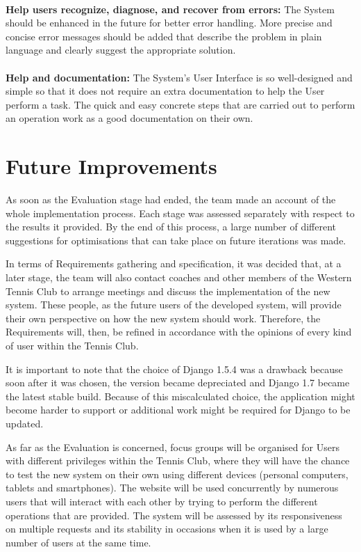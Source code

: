 \documentclass{l3proj}
\begin{document}
 \\
\textbf{Help users recognize, diagnose, and recover from errors:}
The System should be enhanced in the future for better error handling. More precise and concise error messages should be added that describe the problem in plain language and clearly suggest the appropriate solution.\\
 \\
\textbf{Help and documentation:}
The System’s User Interface is so well-designed and simple so that it does not require an extra documentation to help the User perform a task. The quick and easy concrete steps that are carried out to perform an operation work as a good documentation on their own.\\

\section{Future Improvements}
As soon as the Evaluation stage had ended, the team made an account of the whole implementation process. Each stage was assessed separately with respect to the results it provided. By the end of this process, a large number of different suggestions for optimisations that can take place on future iterations was made.\\
\par In terms of Requirements gathering and specification, it was decided that, at a later stage, the team will also contact coaches and other members of the Western Tennis Club to arrange meetings and discuss the implementation of the new system. These people, as the future users of the developed system, will provide their own perspective on how the new system should work. Therefore, the Requirements will, then, be refined in accordance with the opinions of every kind of user within the Tennis Club.\\
\par It is important to note that the choice of Django 1.5.4 was a drawback because soon after it was chosen, the version became depreciated and Django 1.7 became the latest stable build. Because of this miscalculated choice, the application might become harder to support or additional work might be required for Django to be updated.\\
\par As far as the Evaluation is concerned, focus groups will be organised for Users with different privileges within the Tennis Club, where they will have the chance to test the new system on their own using different devices (personal computers, tablets and smartphones). The website will be used concurrently by numerous users that will interact with each other by trying to perform the different operations that are provided.  The system will be assessed by its responsiveness on multiple requests and its stability in occasions when it is used by a large number of users at the same time. 
\end{document}
